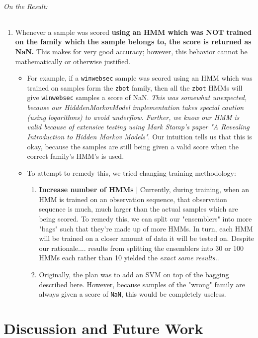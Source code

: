 \documentclass[12pt]{article}
\begin{document}
  \paragraph{On the Result:}
  \begin{enumerate}
    \item Whenever a sample was scored \textbf{using an HMM which was NOT trained on the family which the sample belongs to, the score is returned as NaN.} This makes for very good accuracy; however, this behavior cannot be mathematically or otherwise justified.
      \begin{itemize}
        \item For example, if a \texttt{winwebsec} sample was scored using an HMM which was trained on samples form the \texttt{zbot} family, then all the \texttt{zbot} HMMs will give \texttt{winwebsec} samples a score of NaN. \textit{This was somewhat unexpected, because our HidddenMarkovModel implementation takes special caution (using logarithms) to avoid underflow. Further, we know our HMM is valid because of extensive testing using Mark Stamp's paper "A Revealing Introduction to Hidden Markov Models"}. Our intuition tells us that this is okay, because the samples are still being given a valid score when the correct family's HMM's is used.
        \item To attempt to remedy this, we tried changing training methodology:
          \begin{enumerate}
            \item \textbf{Increase number of HMMs} | Currently, during training, when an HMM is trained on an observation sequence, that observation sequence is much, much larger than the actual samples which are being scored. To remedy this, we can split our "ensemblers" into more "bags" such that they're made up of more HMMs. In turn, each HMM will be trained on a closer amount of data it will be tested on. Despite our rationale.... results from splitting the ensemblers into 30 or 100 HMMs each rather than 10 yielded the \textit{exact same results.}.
        \item Originally, the plan was to add an SVM on top of the bagging described here. However, because samples of the "wrong" family are always given a score of \texttt{NaN}, this would be completely useless.
          \end{enumerate}
     \end{itemize}
  \end{enumerate}

\part{Discussion and Future Work}
\end{document}
